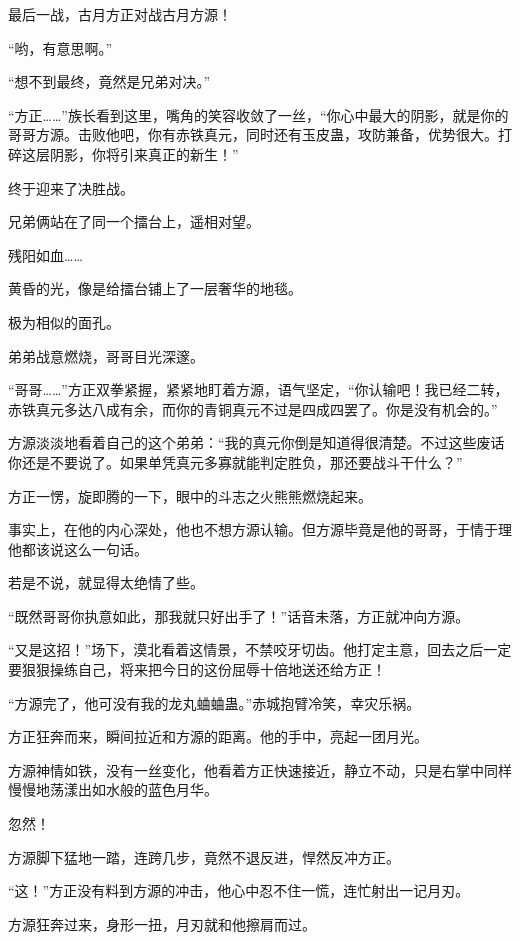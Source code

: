 
\begin{this_body}

最后一战，古月方正对战古月方源！

“哟，有意思啊。”

“想不到最终，竟然是兄弟对决。”

“方正……”族长看到这里，嘴角的笑容收敛了一丝，“你心中最大的阴影，就是你的哥哥方源。击败他吧，你有赤铁真元，同时还有玉皮蛊，攻防兼备，优势很大。打碎这层阴影，你将引来真正的新生！”

终于迎来了决胜战。

兄弟俩站在了同一个擂台上，遥相对望。

残阳如血……

黄昏的光，像是给擂台铺上了一层奢华的地毯。

极为相似的面孔。

弟弟战意燃烧，哥哥目光深邃。

“哥哥……”方正双拳紧握，紧紧地盯着方源，语气坚定，“你认输吧！我已经二转，赤铁真元多达八成有余，而你的青铜真元不过是四成四罢了。你是没有机会的。”

方源淡淡地看着自己的这个弟弟：“我的真元你倒是知道得很清楚。不过这些废话你还是不要说了。如果单凭真元多寡就能判定胜负，那还要战斗干什么？”

方正一愣，旋即腾的一下，眼中的斗志之火熊熊燃烧起来。

事实上，在他的内心深处，他也不想方源认输。但方源毕竟是他的哥哥，于情于理他都该说这么一句话。

若是不说，就显得太绝情了些。

“既然哥哥你执意如此，那我就只好出手了！”话音未落，方正就冲向方源。

“又是这招！”场下，漠北看着这情景，不禁咬牙切齿。他打定主意，回去之后一定要狠狠操练自己，将来把今日的这份屈辱十倍地送还给方正！

“方源完了，他可没有我的龙丸蛐蛐蛊。”赤城抱臂冷笑，幸灾乐祸。

方正狂奔而来，瞬间拉近和方源的距离。他的手中，亮起一团月光。

方源神情如铁，没有一丝变化，他看着方正快速接近，静立不动，只是右掌中同样慢慢地荡漾出如水般的蓝色月华。

忽然！

方源脚下猛地一踏，连跨几步，竟然不退反进，悍然反冲方正。

“这！”方正没有料到方源的冲击，他心中忍不住一慌，连忙射出一记月刃。

方源狂奔过来，身形一扭，月刃就和他擦肩而过。


\end{this_body}
